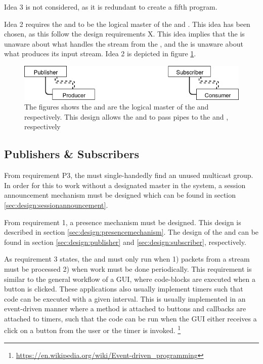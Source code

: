 Idea 3 is not considered, as it is redundant to create a fifth program.

Idea 2 requires the \pubs{} and \subs{} to be the logical master of the \cons{} and \pros{}. This idea has been chosen, as this follow the design requirements X. This idea implies that the \pro{} is unaware about what handles the stream from the \pro{}, and the \con{} is unaware about what produces its input stream. Idea 2 is depicted in figure \ref{fig:design:pubsub:runmode_master}.

\begin{figure}[H]
	\centering
	\includegraphics[width=1\textwidth]{figures/runmode_master}
	\caption{The figures shows the \pub{} and \sub{} are the logical master of the \pro{} and \con{} respectively. This design allows the \pubs{} and \subs{} to pass pipes to the \pro{} and \con{}, respectively} \label{fig:design:pubsub:runmode_master}
\end{figure}

\subsection{Publishers \& Subscribers}
From requirement P3, the \pub{} must single-handedly find an unused multicast group. In order for this to work without a designated master in the system, a session announcement mechanism must be designed which can be found in section \ref{sec:design:sessionannouncement}.


\noindent From requirement 1, a presence mechanism must be designed. This design is described in section \ref{sec:design:presencemechanism}. The design of the \pubs{} and \subs{} can be found in section \ref{sec:design:publisher} and \ref{sec:design:subscriber}, respectively.

As requirement 3 states, the \pubs{} and \subs{} must only run when 1) packets from a stream must be processed  2) when work must be done periodically. This requirement is similar to the general workflow of a \ac{GUI}, where code-blocks are executed when a button is clicked. These applications also usually implement timers such that code can be executed with a given interval. This is usually implemented in an event-driven manner where a method is attached to buttons and callbacks are attached to timers, such that the code can be run when the GUI either receives a click on a button from the user or the timer is invoked. \footnote{\url{https://en.wikipedia.org/wiki/Event-driven_programming}}

